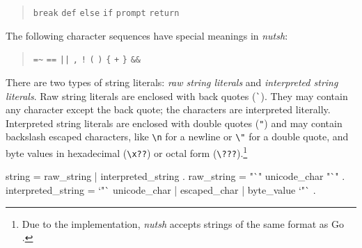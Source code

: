 \documentclass[paper=a4,twoside,abstract=on,cleardoublepage=empty,numbers=noenddot,toc=bib,toc=listof,12pt,appendixprefix=true]{scrreprt}
\begin{document}
\begin{quote}
    \texttt{break}\hspace{0.5em}
    \texttt{def}\hspace{0.5em}
    \texttt{else}\hspace{0.5em}
    \texttt{if}\hspace{0.5em}
    \texttt{prompt}\hspace{0.5em}
    \texttt{return}
\end{quote}


The following character sequences have special meanings in \emph{nutsh}:

\begin{quote}
    \texttt{=\~}\hspace{1em}
    \texttt{==}\hspace{1em}
    \texttt{||}\hspace{1em}
    \texttt{,}\hspace{1em}
    \texttt{!}\hspace{1em}
    \texttt{(}\hspace{1em}
    \texttt{)}\hspace{1em}
    \texttt{\{}\hspace{1em}
    \texttt{+}\hspace{1em}
    \texttt{\}}\hspace{1em}
    \texttt{\&\&}
\end{quote}


There are two types of string literals: \emph{raw string literals} and \emph{interpreted string literals}. Raw string literals are enclosed with back quotes (\texttt{\`}). They may contain any character except the back quote; the characters are interpreted literally. Interpreted string literals are enclosed with double quotes (\texttt{"}) and may contain backslash escaped characters, like \texttt{\textbackslash{}n} for a newline or \texttt{\textbackslash{}"} for a double quote, and byte values in hexadecimal (\texttt{\textbackslash{}x??}) or octal form (\texttt{\textbackslash{}???}).\footnote{Due to the implementation, \emph{nutsh} accepts strings of the same format as Go \cite{google13}.}

\begin{ebnf}
string = raw_string | interpreted_string .
raw_string = "`" { unicode_char } "`" .
interpreted_string = `"` { unicode_char | escaped_char |
    byte_value } `"` .
\end{ebnf}
\end{document}

